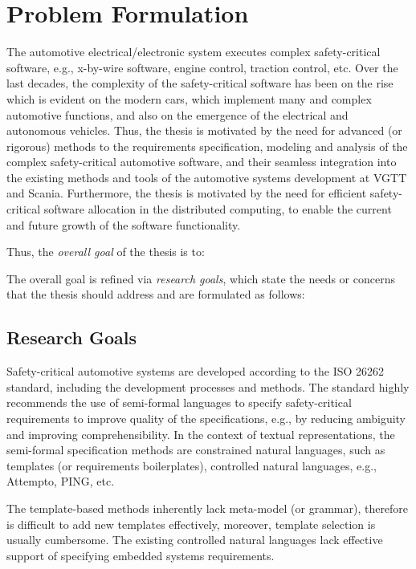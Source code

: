 \chapter{Problem Formulation}
The automotive electrical/electronic system executes complex safety-critical software, e.g., x-by-wire software, engine control, traction control, etc. Over the last decades, the complexity of the safety-critical software has been on the rise which is evident on the modern cars, which implement many and complex automotive functions, and also on the emergence of the electrical and autonomous vehicles. Thus, the thesis is motivated by the need for advanced (or rigorous) methods to the requirements specification, modeling and analysis of the complex safety-critical automotive software, and their seamless integration into the existing methods and tools of the automotive systems development at VGTT and Scania. Furthermore, the thesis is motivated by the need for efficient safety-critical software allocation in the distributed computing, to enable the current and future growth of the software functionality.

Thus, the \textit{overall goal} of the thesis is to:
\begin{center}
\end{center}

The overall goal is refined via \textit{research goals}, which state the needs or concerns that the thesis should address and are formulated as follows:

\section{Research Goals}\label{research_challenges}
Safety-critical automotive systems are developed according to the ISO 26262 standard, including the development processes and methods. The standard highly recommends the use of semi-formal  languages to specify safety-critical requirements to improve quality of the specifications, e.g., by reducing ambiguity and improving comprehensibility. In the context of textual representations, the semi-formal specification methods are constrained natural languages, such as templates (or requirements boilerplates), controlled natural languages, e.g., Attempto, PING, etc.

The template-based methods inherently lack meta-model (or grammar), therefore is difficult to add new templates effectively, moreover, template selection is usually cumbersome. The existing controlled natural languages lack effective support of specifying embedded systems requirements.

